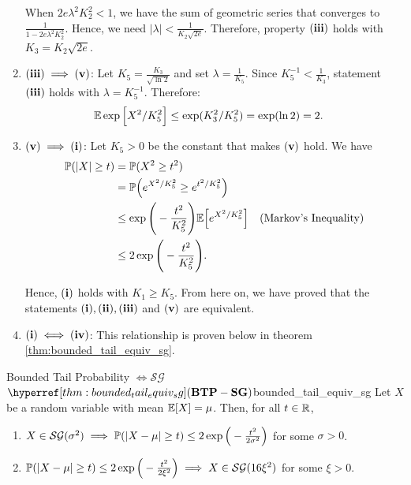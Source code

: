 \begin{proof*}
\begin{enumerate}
		\noindent When $2e\lambda^2K_2^2 < 1$, we have the sum of geometric series that converges to $\frac{1}{1 - 2e\lambda^2K_2^2}$. Hence, we need $|\lambda| < \frac{1}{K_2\sqrt{2e}}$. Therefore, property $\bf (iii)$ holds with $K_3 = K_2\sqrt{2e}$.

		\item ${\bf (iii)}\implies {\bf (v)}$: Let $K_5=\frac{K_3}{\sqrt{\ln 2}}$ and set $\lambda=\frac{1}{K_5}$. Since $K_5^{-1} < \frac{1}{K_3}$, statement $\bf (iii)$ holds with $\lambda=K_5^{-1}$. Therefore:
		\begin{align*}
			\mathbb{E}\exp\Big[ X^2/K_5^2 \Big] &\le \exp(K_3^2/K_5^2) = \exp(\ln 2) = 2.
		\end{align*} 

		\item ${\bf (v)}\implies{\bf (i)}$: Let $K_5>0$ be the constant that makes $\bf (v)$ hold. We have
		\begin{align*}
			\mathbb{P}(|X| \ge t) &= \mathbb{P}(X^2\ge t^2) \\
				&= \mathbb{P}\Big( e^{X^2/K_5^2} \ge e^{t^2/K_5^2} \Big) \\
				&\le \exp\Bigg( -\frac{t^2}{K_5^2} \Bigg)\mathbb{E}\Big[ e^{X^2/K_5^2} \Big] \quad \text{(Markov's Inequality)} \\
				&\le 2\exp\Bigg( -\frac{t^2}{K_5^2} \Bigg).
		\end{align*} 

		\noindent Hence, $\bf (i)$ holds with $K_1\ge K_5$. From here on, we have proved that the statements $\bf (i), (ii), (iii)$ and $\bf (v)$ are equivalent. 

		\item ${\bf (i)} \iff {\bf (iv)}$: This relationship is proven below in theorem \ref{thm:bounded_tail_equiv_sg}.
	\end{enumerate} 
\end{proof*} 

\begin{theorem}{Bounded Tail Probability $\iff \mathcal{SG}$ $\BTPSG$}{bounded_tail_equiv_sg}
	Let $X$ be a random variable with mean $\mathbb{E}[X] = \mu$. Then, for all $t\in\mathbb{R}$,
	\begin{enumerate}[label=(\roman*)]
		\item $X\in\mathcal{SG}(\sigma^2) \implies \mathbb{P} ({|X-\mu|\ge t}) \le 2\exp\Big( -\frac{t^2}{2\sigma^2} \Big)$ for some $\sigma>0$.
		\item $\mathbb{P} ({|X-\mu|\ge t}) \le 2\exp\Big( -\frac{t^2}{2\xi^2} \Big) \implies X\in\mathcal{SG}(16\xi^2)$ for some $\xi>0$.
	\end{enumerate} 
\end{theorem} 

